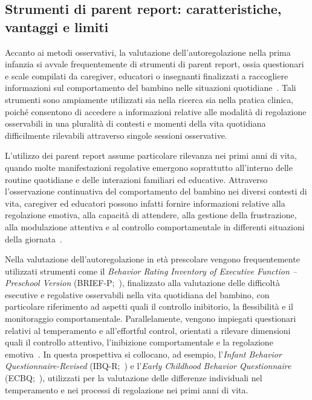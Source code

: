         \subsection{Strumenti di parent report: caratteristiche, vantaggi e limiti}
        \label{sec:3_5_2}

            Accanto ai metodi osservativi, la valutazione dell'autoregolazione nella prima infanzia si avvale frequentemente di strumenti di parent report, ossia questionari e scale compilati da caregiver, educatori o insegnanti finalizzati a raccogliere informazioni sul comportamento del bambino nelle situazioni quotidiane~\cite{toplak2013,berni2025}. Tali strumenti sono ampiamente utilizzati sia nella ricerca sia nella pratica clinica, poiché consentono di accedere a informazioni relative alle modalità di regolazione osservabili in una pluralità di contesti e momenti della vita quotidiana difficilmente rilevabili attraverso singole sessioni osservative.

            L'utilizzo dei parent report assume particolare rilevanza nei primi anni di vita, quando molte manifestazioni regolative emergono soprattutto all'interno delle routine quotidiane e delle interazioni familiari ed educative. Attraverso l'osservazione continuativa del comportamento del bambino nei diversi contesti di vita, caregiver ed educatori possono infatti fornire informazioni relative alla regolazione emotiva, alla capacità di attendere, alla gestione della frustrazione, alla modulazione attentiva e al controllo comportamentale in differenti situazioni della giornata~\cite{gardiner2017,berni2025}.

            Nella valutazione dell'autoregolazione in età prescolare vengono frequentemente utilizzati strumenti come il \emph{Behavior Rating Inventory of Executive Function -- Preschool Version} (BRIEF-P;~\cite{gioia2003}), finalizzato alla valutazione delle difficoltà esecutive e regolative osservabili nella vita quotidiana del bambino, con particolare riferimento ad aspetti quali il controllo inibitorio, la flessibilità e il monitoraggio comportamentale. Parallelamente, vengono impiegati questionari relativi al temperamento e all'effortful control, orientati a rilevare dimensioni quali il controllo attentivo, l'inibizione comportamentale e la regolazione emotiva~\cite{gartstein2003}. In questa prospettiva si collocano, ad esempio, l'\emph{Infant Behavior Questionnaire-Revised} (IBQ-R;~\cite{gartstein2003}) e l'\emph{Early Childhood Behavior Questionnaire} (ECBQ;~\cite{putnam2006}), utilizzati per la valutazione delle differenze individuali nel temperamento e nei processi di regolazione nei primi anni di vita.

